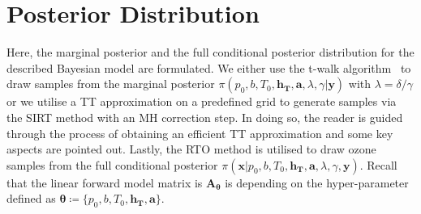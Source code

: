 \section{Posterior Distribution}
Here, the marginal posterior and the full conditional posterior distribution for the described Bayesian model are formulated.
We either use the t-walk algorithm~\cite{christen2010general} to draw samples from the marginal posterior $\pi(p_0,b,T_0,\bm{h_T},\bm{a} ,\lambda, \gamma| \bm{y})$ with $\lambda = \delta / \gamma$ or we utilise a TT approximation on a predefined grid to generate samples via the SIRT method with an MH correction step.
In doing so, the reader is guided through the process of obtaining an efficient TT approximation and some key aspects are pointed out. 
Lastly, the RTO method is utilised to draw ozone samples from the full conditional posterior $\pi(\bm{x}|p_0,b,T_0,\bm{h_T},\bm{a} ,\lambda, \gamma, \bm{y})$.
Recall that the linear forward model matrix is $\bm{A}_{\bm{\theta}}$ is depending on the hyper-parameter defined as $\bm{\theta}  \coloneqq \{p_0,b,T_0,\bm{h_T},\bm{a}  \}$.
